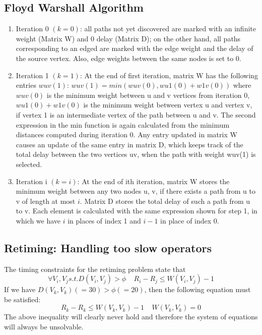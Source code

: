 \documentclass{acm_proc_article-sp}
\begin{document}
\subsection{Floyd Warshall Algorithm}

\begin{enumerate}
  \item Iteration 0 $(k = 0)$: all paths not yet discovered are marked with an
    infinite weight (Matrix W) and 0 delay (Matrix D);
    on the other hand, all paths corresponding to an edged are marked with the
    edge weight and the delay of the source vertex. Also, edge weights between
    the same nodes is set to 0.
  \item Iteration 1 $(k = 1)$: At the end of first iteration,  matrix W has the
    following entries $wuv(1)$: $wuv(1) = min( wuv(0), wu1(0) + w1v(0) )$
    where $wuv(0)$ is the minimum weight between u and v vertices from iteration
    0, $wu1(0) + w1v(0)$ is the minimum weight between vertex u and vertex v,
    if vertex 1 is an intermediate vertex of the path between u and v. The second
    expression in the min function is again calculated from the minimum distances
    computed during iteration 0.
    Any entry updated in matrix W causes an update of the same entry in matrix D,
    which keeps track of the total delay between the two vertices uv, when the path
    with weight wuv(1) is selected.
  \item Iteration i $(k = i)$: At the end of ith iteration, matrix W stores
    the minimum weight between any two nodes u, v, if there exists a path from
    u to v of length at most $i$. Matrix D stores the total delay of such a path
    from u to v. Each element is calculated with the same expression shown
    for step 1, in which we have $i$ in places of index 1 and $i - 1$ in place
    of index 0.
\end{enumerate}


\subsection{Retiming: Handling too slow operators}

The timing constraints for the retiming problem  state that
\begin{equation}
  \forall V_{i}, V_{j} s.t. D(V_{i}, V_{j}) > \phi \ \ \ \ \  R_{i} - R_{j} \leq W(V_{i}, V_{j}) - 1
\end{equation}
If we have $D(V_{k}, V_{k}) (=30) > \phi (=20)$, then the following equation must be satisfied:
\begin{equation}
  R_{k} - R_{k} \leq W(V_{k}, V_{k}) - 1 \ \ \ \ \  W(V_{k}, V_{k}) = 0
\end{equation}
The above inequality will clearly never hold and therefore the system of equations  will always be unsolvable.
\end{document}
